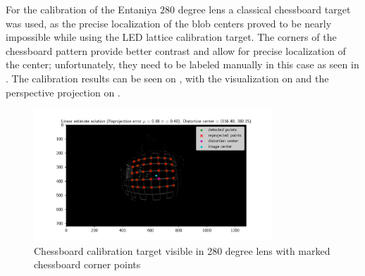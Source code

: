 For the calibration of the Entaniya $280$ degree lens a classical chessboard target was used, as the precise localization of the blob centers proved to be nearly impossible while using the \ac{LED} lattice calibration target. The corners of the chessboard pattern provide
better contrast and allow for precise localization of the center; unfortunately, they need to be labeled manually in this case as seen in .
The calibration results can be seen on , with the visualization on  and the perspective projection on
.
\begin{figure}[htbp]
	\centering
        \includegraphics[width=0.8\textwidth]{./fig/pgfplot/build/chessboard_280.pdf}
	\caption{Chessboard calibration target visible in 280 degree lens with marked chessboard corner points}
	\label{fig:calib_ent_label}
\end{figure}

